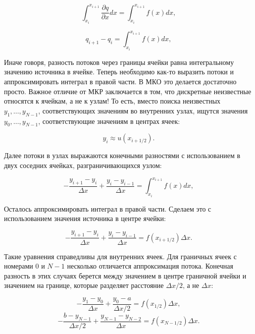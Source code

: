 \documentclass[a4paper, 11pt]{article}
\begin{document}
\begin{equation}
	\int_{x_i}^{x_{i+1}} \frac{\partial q}{\partial x}dx = \int_{x_i}^{x_{i+1}} f(x)dx,
\end{equation}

\begin{equation}
	q_{i+1} - q_i = \int_{x_i}^{x_{i+1}} f(x)dx,
\end{equation}

 Иначе говоря, разность потоков через границы ячейки равна интегральному значению
источника в ячейке. Теперь необходимо как-то выразить потоки и аппроксимировать интеграл в правой части. В МКО это делается достаточно просто. Важное отличие от МКР заключается в том, что дискретные неизвестные относятся к ячейкам, а не к узлам! То есть,
вместо поиска неизвестных $y_1, \dots, y_{N-1}$, соответствующих значениям во внутренних узлах,
ищутся значения $y_0, \dots, y_{N-1}$, соответствующие значениям в центрах ячеек:

\begin{equation}
	y_i \approx u(x_{i+1/2}).
\end{equation}

Далее потоки в узлах выражаются конечными разностями с использованием в двух
соседних ячейках, разграничивающихся узлом:

\begin{equation}
	-\frac{y_{i+1} - y_i}{\Delta x} + \frac{y_i - y_{i-1}}{\Delta x} = \int_{x_i}^{x_{i+1}} f(x)dx,
\end{equation}

 Осталось аппроксимировать интеграл в правой части. Сделаем это с использованием
значения источника в центре ячейки:

\begin{equation}
	-\frac{y_{i+1} - y_i}{\Delta x} + \frac{y_i - y_{i-1}}{\Delta x} = f(x_{i+1/2})\Delta x.
\end{equation}

Такие уравнения справедливы для внутренних ячеек. Для граничных ячеек с номерами $0$ и $N-1$ несколько отличается аппроксимация потока. Конечная разность в этих случаях берется между
значением в центре граничной ячейки и значением на границе, которые разделяет расстояние $\Delta x / 2$, а не $\Delta x$:

\begin{equation}
	-\frac{y_1 - y_0}{\Delta x} + \frac{y_0 - a}{\Delta x / 2} = f(x_{1/2})\Delta x,
\end{equation}
\begin{equation}
	-\frac{b - y_{N-1}}{\Delta x / 2} + \frac{y_{N-1} - y_{N-2}}{\Delta x} = f(x_{N-1/2})\Delta x.
\end{equation}
\end{document}
